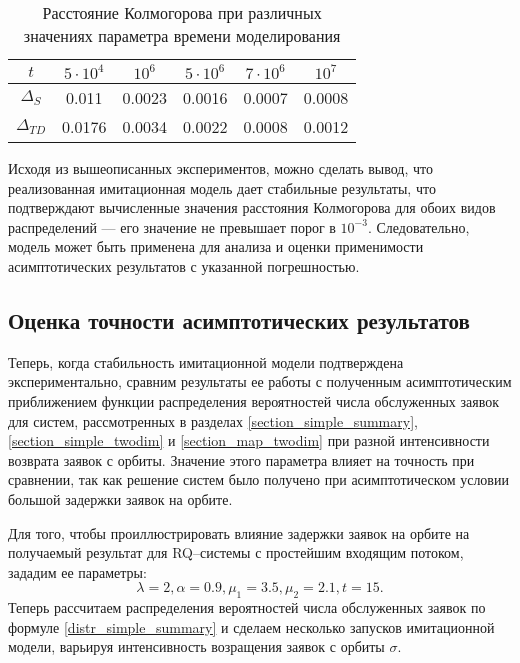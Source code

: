 \begin{table}[h!] 
	\centering
	\caption{Расстояние Колмогорова при различных значениях параметра времени моделирования}
	\label{time_dynamics}
	\begin{tabular}{| c | c | c | c | c | c |} 
		\hline
		$t$ & $5\cdot 10^4$ & $10^6$ & $5\cdot 10^6$ & $7\cdot 10^6$ & $10^7$\\ 
		\hline
		$\Delta_S$ & 0.011 & 0.0023 & 0.0016 & 0.0007 & 0.0008\\
		\hline
		$\Delta_{TD}$ & 0.0176 & 0.0034 & 0.0022 & 0.0008 & 0.0012\\
		\hline
	\end{tabular}
\end{table} 

Исходя из вышеописанных экспериментов, можно сделать вывод, что реализованная имитационная модель дает стабильные результаты, что подтверждают вычисленные значения расстояния Колмогорова для обоих видов распределений --- его значение не превышает порог в $10^{-3}$. Следовательно, модель может быть применена для анализа и оценки применимости асимптотических результатов с указанной погрешностью.
\subsection{Оценка точности асимптотических результатов}
Теперь, когда стабильность имитационной модели подтверждена экспериментально, сравним результаты ее работы с полученным асимптотическим приближением функции распределения вероятностей числа обслуженных заявок для систем, рассмотренных в разделах \ref{section_simple_summary}, \ref{section_simple_twodim} и \ref{section_map_twodim} при разной интенсивности возврата заявок с орбиты. Значение этого параметра влияет на точность при сравнении, так как решение систем было получено при асимптотическом условии большой задержки заявок на орбите.

Для того, чтобы проиллюстрировать влияние задержки заявок на орбите на получаемый результат для RQ--системы с простейшим входящим потоком, зададим ее параметры:
\begin{equation} \label{simple_summary_input_params}
	\lambda = 2,
	\alpha = 0.9,
	\mu_{1} = 3.5,
	\mu_{2} = 2.1, 
	t = 15.
\end{equation}
Теперь рассчитаем распределения вероятностей числа обслуженных заявок по формуле \eqref{distr_simple_summary} и сделаем несколько запусков имитационной модели, варьируя интенсивность возращения заявок с орбиты $\sigma$.


